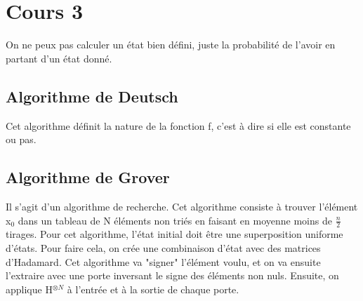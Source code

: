 \section{Cours 3}
On ne peux pas calculer un état bien défini, juste la probabilité de l'avoir en partant d'un état donné.

\subsection{Algorithme de Deutsch}
Cet algorithme définit la nature de la fonction f, c'est à dire si elle est constante ou pas.

\subsection{Algorithme de Grover}
Il s'agit d'un algorithme de recherche. Cet algorithme consiste à trouver l'élément x$_0$ dans un tableau de N éléments
non triés en faisant en moyenne moins de $\frac{n}{2}$ tirages. Pour cet algorithme, l'état initial doit être une
superposition uniforme d'états. Pour faire cela, on crée une combinaison d'état avec des matrices d'Hadamard. Cet
algorithme va "signer" l'élément voulu, et on va ensuite l'extraire avec une porte inversant le signe des éléments non
nuls. Ensuite, on applique H$^{\otimes N}$ à l'entrée et à la sortie de chaque porte.
